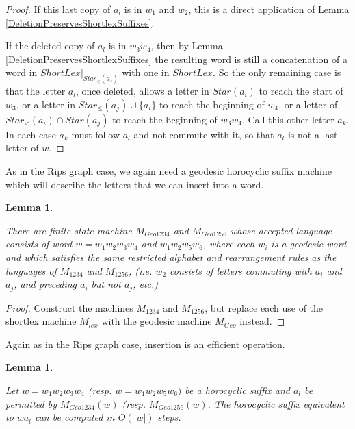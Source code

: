 \documentclass{amsart}
\newtheorem{lemma}[theorem]{Lemma}
\theoremstyle{definition}
\theoremstyle{remark}
\begin{document}
	\begin{proof}
		
		If this last copy of $a_l$ is in $w_1$ and $w_2$, this is a direct application of Lemma \ref{DeletionPreservesShortlexSuffixes}.
		
		If the deleted copy of $a_l$ is in $w_3w_4$, then by Lemma \ref{DeletionPreservesShortlexSuffixes} the resulting word is still a concatenation of a word in $ShortLex|_{Star_<(a_j)}$ with one in $ShortLex$. So the only remaining case is that the letter $a_l$, once deleted, allows a letter in $Star(a_i)$ to reach the start of $w_3$, or a letter in $Star_\le (a_j)\cup\{a_i\}$ to reach the beginning of $w_4$, or a letter of $Star_<(a_i)\cap Star(a_j)$ to reach the beginning of $w_3w_4$. Call this other letter $a_k$. In each case $a_k$ must follow $a_l$ and not commute with it, so that $a_l$ is not a last letter of $w$.
	\end{proof}
	
	As in the Rips graph case, we again need a geodesic horocyclic suffix machine which will describe the letters that we can insert into a word.
	
	\begin{lemma}\label{GeoHoroSuffMachine}
		
		There are finite-state machine $M_{Geo1234}$ and $M_{Geo1256}$ whose accepted language consists of word $w=w_1w_2w_3w_4$ and $w_1w_2w_5w_6$, where each $w_i$ is a geodesic word and which satisfies the same restricted alphabet and rearrangement rules as the languages of $M_{1234}$ and $M_{1256}$, (i.e. $w_2$ consists of letters commuting with $a_i$ and $a_j$, and preceding $a_i$ but not $a_j$, etc.)
		
	\end{lemma}
	
	\begin{proof}
		
		Construct the machines $M_{1234}$ and $M_{1256}$, but replace each use of the shortlex machine $M_{lex}$ with the geodesic machine $M_{Geo}$ instead.
	\end{proof}
	
	Again as in the Rips graph case, insertion is an efficient operation.
	
	\begin{lemma}\label{HorocyclicInsertion}
		
		Let $w=w_1w_2w_3w_4$ (resp. $w=w_1w_2w_5w_6)$ be a horocyclic suffix and $a_l$ be permitted by $M_{Geo1234}(w)$ (resp. $M_{Geo1256}(w)$. The horocyclic suffix equivalent to $wa_l$ can be computed in $O(|w|)$ steps.
		
	\end{lemma}
	
\end{document}
